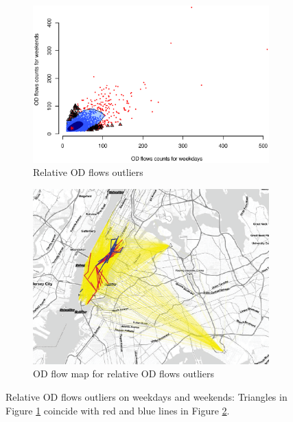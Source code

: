 \documentclass[a4paper,UKenglish]{lipics-v2018}
\providecommand{\DIFdelend}{} %
\begin{document}
\DIFdelend \begin{figure}
	\centering
	\begin{subfigure}[b]{0.49\textwidth}
		\includegraphics[width=\textwidth]{images/Outliers_rare_weekdays_weekends.eps}
		\caption{Relative OD flows outliers}
		\label{fig:weekdays_rare}
	\end{subfigure}
	\hfill %
	\begin{subfigure}[b]{0.49\textwidth}
		\includegraphics[width=\textwidth]{images/outliers_rare2_weekdays_weekends.eps}
		\caption{OD flow map for relative OD flows outliers}
		\label{fig:weekdays_rare_map}
	\end{subfigure}
	\caption{Relative OD flows outliers on weekdays and weekends: Triangles in Figure \ref{fig:weekdays_rare} coincide with red and blue lines in Figure \ref{fig:weekdays_rare_map}. }\label{fig:weekdays_rare_OD_map}	
\end{figure}
\end{document}
